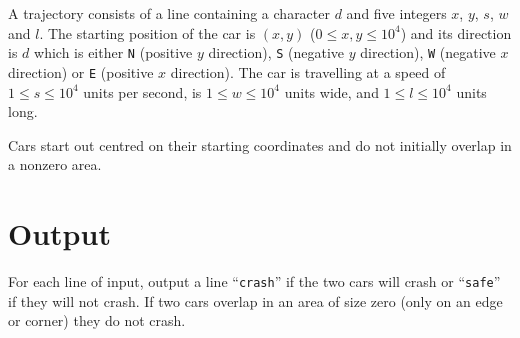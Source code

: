 A trajectory consists of a line containing a character $d$ and five
integers $x$, $y$, $s$, $w$ and $l$.
The starting position of the car is $(x,y)$ ($0 \le x, y \le 10^4$)
and its direction is $d$ which is either \texttt{N} (positive $y$
direction), \texttt{S} (negative $y$ direction), \texttt{W} (negative
$x$ direction) or \texttt{E} (positive $x$ direction).  The car is
travelling at a speed of $1 \le s \le 10^4$ units per second, is $1 \le
w \le 10^4$ units wide, and $1 \le l \le 10^4$ units long.

Cars start out centred on their starting coordinates and do not initially
overlap in a nonzero area.

\section*{Output}

For each line of input, output a line ``\texttt{crash}'' if the two cars will
crash or ``\texttt{safe}'' if they will not crash. If two cars overlap in an
area of size zero (only on an edge or corner) they do not crash.
